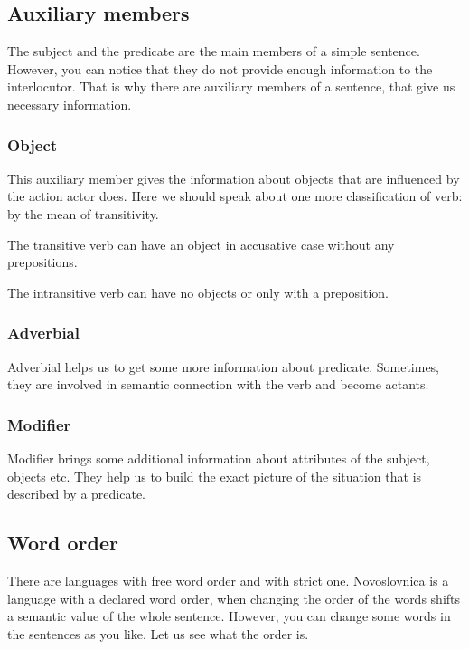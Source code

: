 \subsection{Auxiliary members}

The subject and the predicate are the main members of a simple sentence. However, you can notice that they do not provide  enough information to the interlocutor. That is why there are auxiliary members of a sentence, that give us necessary information.

\subsubsection{Object}

This auxiliary member gives the information about objects that are influenced by the action actor does. 
Here we should speak about one more classification of verb: by the mean of transitivity.

The transitive verb can have an object in accusative case without any prepositions.

The intransitive verb can have no objects or only with a preposition. 

\subsubsection{Adverbial}

Adverbial helps us to get some more information about predicate. Sometimes, they are involved in semantic connection with the verb and become actants. 

\subsubsection{Modifier}

Modifier brings some additional information about attributes of the subject, objects etc. They help us to build the exact picture of the situation that is described by a predicate.

\subsection{Word order}

There are languages with free word order and with strict one. Novoslovnica is a language with a declared word order, when changing the order of the words shifts a semantic value of the whole sentence. However, you can change some words in the sentences as you like. Let us see what the order is.


